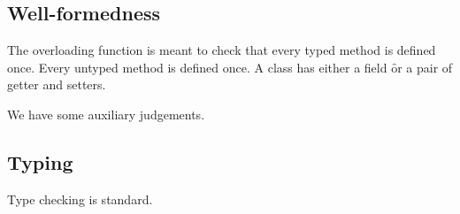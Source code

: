 \documentclass[a4paper,USenglish]{tex/lipics-v2016}
\begin{document}
\subsection{Well-formedness}

The overloading function is meant to check that every typed method is
defined once. Every untyped method is defined once. A class has either a
field \f or a pair of getter and setters.


\begin{mathpar}
\end{mathpar}

We have some auxiliary judgements.

\begin{mathpar}







\end{mathpar}



\subsection{Typing}



Type checking is standard.
\end{document}
